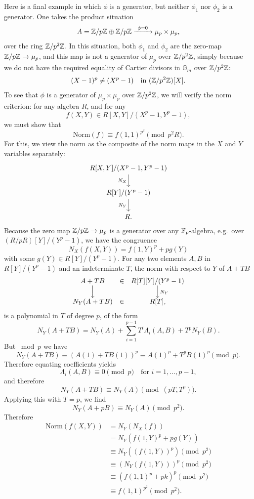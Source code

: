 \kmitem\label{km:1.11.5}
Here is a final example in which $\phi$ is a generator, but neither $\phi_1$ nor $\phi_2$ is a generator. One takes the product situation
\[
A = \mathbb{Z}/p\mathbb{Z} \oplus \mathbb{Z}/p\mathbb{Z} \xrightarrow{\ \phi=0\ } \mu_p \times \mu_p,
\]
over the ring $\mathbb{Z}/p^2\mathbb{Z}$. In this situation, both $\phi_1$ and $\phi_2$ are the zero-map $\mathbb{Z}/p\mathbb{Z} \to \mu_p$, and this map is not a generator of $\mu_p$ over $\mathbb{Z}/p^2\mathbb{Z}$, simply because we do not have the required equality of Cartier divisors in $\mathbb{G}_m$ over $\mathbb{Z}/p^2\mathbb{Z}$:
\[
(X - 1)^p \neq (X^p - 1) \quad \text{in } (\mathbb{Z}/p^2\mathbb{Z})[X].
\]
To see that $\phi$ is a generator of $\mu_p \times \mu_p$ over $\mathbb{Z}/p^2\mathbb{Z}$, we will verify the norm criterion: for any algebra $R$, and for any
\[
f(X, Y) \in R[X, Y]/(X^p - 1, Y^p - 1),
\]
we must show that
\[
\mathrm{Norm}(f) \equiv f(1, 1)^{p^2} \pmod{p^2 R}.
\]
For this, we view the norm as the composite of the norm maps in the $X$ and $Y$ variables separately:
\[
\begin{tikzcd}
R[X, Y]/(X^p - 1, Y^p - 1) \arrow[d, "N_X"'] \\
R[Y]/(Y^p - 1) \arrow[d, "N_Y"'] \\
R.
\end{tikzcd}
\]
Because the zero map $\mathbb{Z}/p\mathbb{Z} \to \mu_p$ is a generator over any $\mathbb{F}_p$-algebra, e.g.\ over $(R/pR)[Y]/(Y^p - 1)$, we have the congruence
\[
N_X(f(X, Y)) = f(1, Y)^p + p g(Y)
\]
with some $g(Y) \in R[Y]/(Y^p - 1)$. For any two elements $A, B$ in $R[Y]/(Y^p - 1)$ and an indeterminate $T$, the norm with respect to $Y$ of $A + TB$
\[
\begin{array}{ccc}
A + TB & \in & R[T][Y]/(Y^p - 1) \\
\Big\downarrow & & \Big\downarrow\rlap{$\scriptstyle N_Y$} \\
N_Y(A + TB) & \in & R[T],
\end{array}
\]
is a polynomial in $T$ of degree $p$, of the form
\[
N_Y(A + TB) = N_Y(A) + \sum_{i=1}^{p-1} T^i \Lambda_i(A, B) + T^p N_Y(B).
\]
But $\bmod p$ we have
\[
N_Y(A + TB) \equiv (A(1) + TB(1))^p \equiv A(1)^p + T^p B(1)^p \pmod p.
\]
Therefore equating coefficients yields
\[
\Lambda_i(A, B) \equiv 0 \pmod p \quad \text{for } i = 1, \dots, p-1,
\]
and therefore
\[
N_Y(A + TB) \equiv N_Y(A) \pmod{(pT, T^p)}.
\]
Applying this with $T = p$, we find
\[
N_Y(A + pB) \equiv N_Y(A) \pmod{p^2}.
\]
Therefore
\begin{align*}
\mathrm{Norm}(f(X, Y)) &= N_Y(N_X(f)) \\
&= N_Y(f(1, Y)^p + pg(Y)) \\
&\equiv N_Y((f(1, Y))^p) \pmod{p^2} \\
&\equiv (N_Y(f(1, Y)))^p \pmod{p^2} \\
&\equiv (f(1, 1)^p + pk)^p \pmod{p^2} \\
&\equiv f(1, 1)^{p^2} \pmod{p^2}.
\end{align*}

